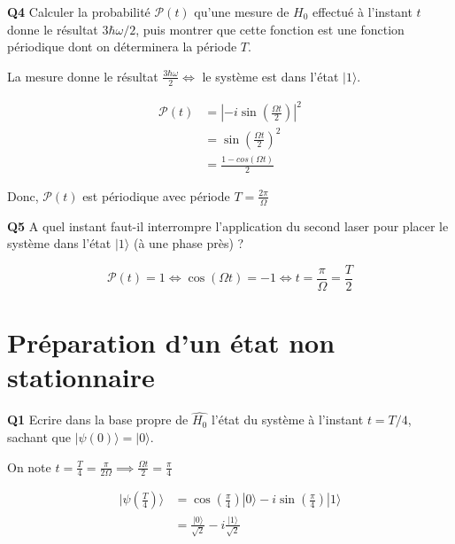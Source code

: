 \documentclass[french]{article}
\begin{document}
	\begin{tcolorbox}[colback=gray!5!white,colframe=gray!75!black]
		\textbf{\large{Q4}} Calculer la probabilité $\mathcal{P}(t)$ qu'une mesure de $H_0$ effectué à l'instant $t$ donne le résultat $3\hbar \omega /2$, puis montrer que cette fonction est une fonction périodique dont on déterminera la période $T$. 
	\end{tcolorbox}

	La mesure donne le résultat $\frac{3\hbar \omega}{2} \iff$ le système est dans l'état $|1\rangle$.
	
	\begin{align}
		\mathcal{P}(t) &= \left|-i \sin\left(\frac{\Omega t}{2}\right)\right|^2\\
		&= \sin\left(\frac{\Omega t}{2}\right)^2\\
		&= \frac{1 - cos\left(\Omega t\right)}{2}
	\end{align}
	
	Donc, $\mathcal{P}(t)$ est périodique avec période $T = \frac{2\pi}{\Omega}$

	\begin{tcolorbox}[colback=gray!5!white,colframe=gray!75!black]
		\textbf{\large{Q5}} A quel instant faut-il interrompre l'application du second laser pour placer le système dans l'état $|1\rangle$ (à une phase près) ? 
	\end{tcolorbox}

	\[\mathcal{P}(t) = 1 \iff \cos(\Omega t) = -1 \iff t = \frac{\pi}{\Omega} = \frac{T}{2}\]

	\section{Préparation d'un état non stationnaire}

	\begin{tcolorbox}[colback=gray!5!white,colframe=gray!75!black]
		\textbf{\large{Q1}} Ecrire dans la base propre de $\hat{H_0}$ l'état du système à l'instant $t = T/4$, sachant que $|\psi(0)\rangle = |0\rangle$.
	\end{tcolorbox}

	On note $t = \frac{T}{4} = \frac{\pi}{2\Omega} \implies \frac{\Omega t}{2} = \frac{\pi}{4}$

	\begin{align}
	|\psi(\frac{T}{4})\rangle &= \cos\left(\frac{\pi}{4}\right)|0\rangle - i \sin\left(\frac{\pi}{4}\right)|1\rangle\\
	&= \frac{|0\rangle}{\sqrt{2}} - i \frac{|1\rangle}{\sqrt{2}}
	\end{align}
\end{document}
